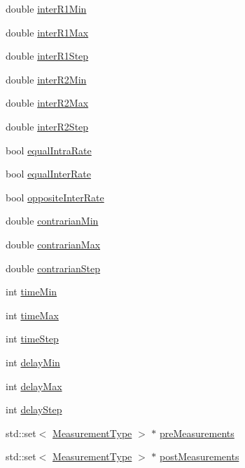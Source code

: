 \begin{DoxyCompactItemize}
\item 
double \hyperlink{class_voter_experiment_a46f2fcbd4356bf8d89de85048ee086fb}{inter\+R1\+Min}
\item 
double \hyperlink{class_voter_experiment_a9bdf90b5a8c519608bb14337b7b6a884}{inter\+R1\+Max}
\item 
double \hyperlink{class_voter_experiment_ab720cd6c457bc899a795c95a95922b54}{inter\+R1\+Step}
\item 
double \hyperlink{class_voter_experiment_a8ddf85950b96c4b19081b77e61e5cb74}{inter\+R2\+Min}
\item 
double \hyperlink{class_voter_experiment_a50fba0900d0a667baa81860789104b08}{inter\+R2\+Max}
\item 
double \hyperlink{class_voter_experiment_af0b724b2c343c5d94bceed53b0f7bfec}{inter\+R2\+Step}
\item 
bool \hyperlink{class_voter_experiment_a7f84a77316202aad327b2aa2cf16829c}{equal\+Intra\+Rate}
\item 
bool \hyperlink{class_voter_experiment_a95947b09a90a06bbf9246a0c89779411}{equal\+Inter\+Rate}
\item 
bool \hyperlink{class_voter_experiment_a6d5ba67afc5efb089c3aaf0da507f0e2}{opposite\+Inter\+Rate}
\item 
double \hyperlink{class_voter_experiment_a8f63fda5e3d9e999338d8dad4e8c7fec}{contrarian\+Min}
\item 
double \hyperlink{class_voter_experiment_ad98a9b74ed00fff511a28ac7f2eb3ea5}{contrarian\+Max}
\item 
double \hyperlink{class_voter_experiment_a97cb958e2e52c3edd65bcfad893ffbe6}{contrarian\+Step}
\item 
int \hyperlink{class_voter_experiment_aa27e26baf58fb885bf20bc437bbc8b04}{time\+Min}
\item 
int \hyperlink{class_voter_experiment_ae02232a37adc28d878214b02ed23afd6}{time\+Max}
\item 
int \hyperlink{class_voter_experiment_ad84ef40e21aeb5406a954d6ff38d7dc4}{time\+Step}
\item 
int \hyperlink{class_voter_experiment_a65edc09b6f6077cd29739e8f93c46246}{delay\+Min}
\item 
int \hyperlink{class_voter_experiment_a1556d0e6c7c1590a8ba3604806738b51}{delay\+Max}
\item 
int \hyperlink{class_voter_experiment_a1c95cd8bdfefbcb1c51560f2b9fc5b85}{delay\+Step}
\item 
std\+::set$<$ \hyperlink{voter__graph_8hpp_ad35f880f44d18d9c643f02c4057034f7}{Measurement\+Type} $>$ $\ast$ \hyperlink{class_voter_experiment_a1de8c983105c4c2dabe6155f716bef93}{pre\+Measurements}
\item 
std\+::set$<$ \hyperlink{voter__graph_8hpp_ad35f880f44d18d9c643f02c4057034f7}{Measurement\+Type} $>$ $\ast$ \hyperlink{class_voter_experiment_a858051eb0f9c27891f50ddfb982b2534}{post\+Measurements}
\end{DoxyCompactItemize}
